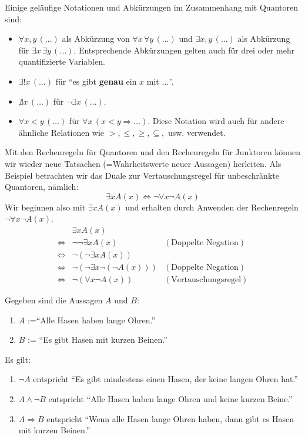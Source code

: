 \begin{example}
  Einige geläufige Notationen und Abkürzungen im Zusammenhang mit Quantoren sind:
  \begin{itemize}
  \item $\forall x,y\,(\dots)$ als Abkürzung von $\forall x\,\forall y\, (\dots)$ und $\exists x,y\,(\dots)$ als Abkürzung für $\exists x\,\exists y\,(\dots)$. Entsprechende Abkürzungen gelten auch für drei oder mehr quantifizierte Variablen.
  \item $\exists ! x\,(\dots)$ für ``es gibt \textbf{genau} ein $x$ mit $\dots$''.
  \item $\nexists x\,(\dots)$ für $\neg\exists x\,(\dots)$.
  \item $\forall x<y\,(\dots)$ für $\forall x\,(x<y\Rightarrow \dots)$. Diese Notation wird auch für andere ähnliche Relationen wie $ >,\leq, \geq, \subseteq, $ usw. verwendet.
\end{itemize}
\end{example}

\begin{example}
 Mit den Rechenregeln für Quantoren und den Rechenregeln für Junktoren können wir wieder neue Tatsachen (=Wahrheitswerte neuer Aussagen) herleiten. Als Beispiel betrachten wir das Duale zur Vertauschungsregel für unbeschränkte Quantoren, nämlich:
\[
 \exists xA(x)\Leftrightarrow \neg \forall x\neg A(x)
\]
Wir beginnen also mit $\exists xA(x)$ und erhalten durch Anwenden der Rechenregeln $\neg \forall x\neg A(x)$.
\begin{align*}
 &\exists xA(x)\\
\Leftrightarrow&\neg\neg\exists xA(x)&(\text{Doppelte Negation}) \\
\Leftrightarrow&\neg(\neg\exists x A(x))\\
\Leftrightarrow&\neg(\neg\exists x \neg(\neg A(x)))&(\text{Doppelte Negation})\\
\Leftrightarrow&\neg(\forall x\neg A(x))&(\text{Vertauschungsregel})
\end{align*}
\end{example}

\begin{example}
Gegeben sind die Aussagen $A$ und $B$:
\begin{enumerate}
\item[] $A$ :=``Alle Hasen haben lange Ohren.''
\item[] $B$ := ``Es gibt Hasen mit kurzen Beinen.''
\end{enumerate}
\tcblower
Es gilt:
\begin{enumerate}
 \item $\neg A$ entspricht ``Es gibt mindestens einen Hasen, der keine langen Ohren hat.''
\item $A\wedge \neg B$ entspricht ``Alle Hasen haben lange Ohren und keine kurzen Beine.''
\item $A\Rightarrow B$ entspricht ``Wenn alle Hasen lange Ohren haben, dann gibt es Hasen mit kurzen Beinen.''
\end{enumerate}
\end{example}

